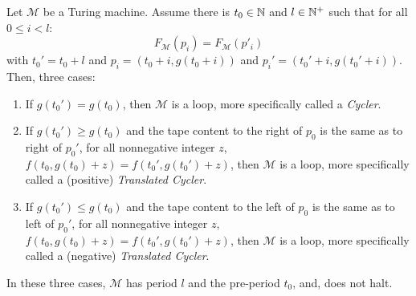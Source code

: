 \begin{theorem}[Loops]\label{th:loops:theory} Let $\mathcal{M}$ be a Turing machine.
    Assume there is $ t_0 \in \mathbb{N}$ and $l \in \mathbb{N}^+$ such that
    for all $0 \leq i < l$: $$F_\mathcal{M}(p_i)   = F_\mathcal{M}(p'_i)$$
    with $t_0' = t_0+l$ and $p_i = (t_0+i, g(t_0+i))$ and $p_i' = (t_0'+i, g(t_0'+i))$. Then, three cases:
    \begin{enumerate}
        \item If $g(t_0') = g(t_0)$, then $\mathcal{M}$ is a loop, more specifically called a \textit{Cycler}.\label{th:case1}
        \item If $g(t_0') \geq g(t_0)$ and the tape content to the right of $p_0$ is the same as to right of $p_0'$, \ie for all nonnegative integer $z$, $f(t_0,g(t_0)+z) = f(t_0',g(t_0')+z)$, then $\mathcal{M}$ is a loop, more specifically called a (positive) \textit{Translated Cycler}.\label{th:case2}
        \item If $g(t_0') \leq g(t_0)$ and the tape content to the left of $p_0$ is the same as to left of $p_0'$, \ie for all nonnegative integer $z$, $f(t_0,g(t_0)+z) = f(t_0',g(t_0')+z)$, then $\mathcal{M}$ is a loop, more specifically called a (negative) \textit{Translated Cycler}.\label{th:case3}
    \end{enumerate}
    In these three cases, $\mathcal{M}$ has period $l$ and the pre-period $t_0$, and, does not halt.
\end{theorem}

